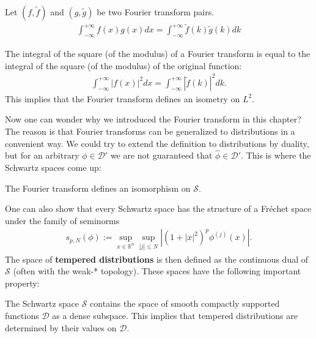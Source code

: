     \begin{theorem}[Parceval]\label{transforms:parcevals_theorem}
        Let $(f, \widetilde{f})$ and $(g,\widetilde{g})$ be two Fourier transform pairs.
        \begin{gather}
            \int_{-\infty}^{+\infty}f(x)g(x)dx = \int_{-\infty}^{+\infty}\widetilde{f}(k)\widetilde{g}(k)dk
        \end{gather}
    \end{theorem}
    \begin{result}[Plancherel]\label{transforms:plancherel_theorem}
        The integral of the square (of the modulus) of a Fourier transform is equal to the integral of the square (of the modulus) of the original function:
        \begin{gather}
            \int_{-\infty}^{+\infty}|f(x)|^2dx = \int_{-\infty}^{+\infty}|\widetilde{f}(k)|^2dk.
        \end{gather}
        This implies that the Fourier transform defines an isometry on $L^2$.
    \end{result}

    Now one can wonder why we introduced the Fourier transform in this chapter? The reason is that Fourier transforms can be generalized to distributions in a convenient way. We could try to extend the definition to distributions by duality, but for an arbitrary $\phi\in\mathcal{D}'$ we are not guaranteed that $\widehat{\phi}\in\mathcal{D}'$. This is where the Schwartz spaces come up:
    \begin{property}
        The Fourier transform defines an isomorphism on $\mathscr{S}$.
    \end{property}
    One can also show that every Schwartz space has the structure of a Fr\'echet space under the family of seminorms
    \begin{gather}
        s_{p,N}(\phi) := \sup_{x\in\mathbb{R}^n}\sup_{|j|\leq N}\left|(1+|x|^2)^p\phi^{(j)}(x)\right|.
    \end{gather}
    The space of \textbf{tempered distributions} is then defined as the continuous dual of $\mathscr{S}$ (often with the weak-* topology). These spaces have the following important property:
    \begin{property}
        The Schwartz space $\mathscr{S}$ contains the space of smooth compactly supported functions $\mathcal{D}$ as a dense subspace. This implies that tempered distributions are determined by their values on $\mathcal{D}$.
    \end{property}

